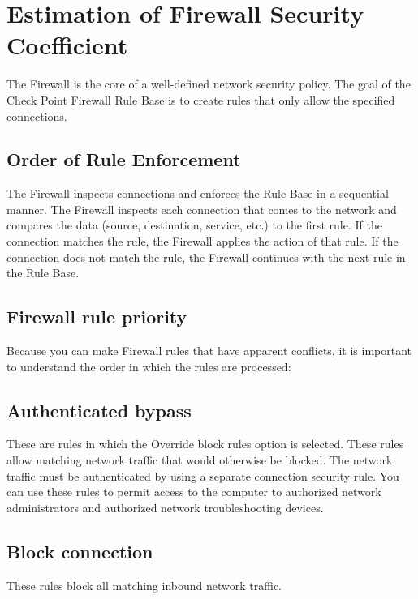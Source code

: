 
\section{Estimation of Firewall Security Coefficient}

The Firewall is the core of a well-defined network security policy. The goal of the Check Point Firewall Rule Base is to create rules that only allow the specified connections.
\subsection{Order of Rule Enforcement}
The Firewall inspects connections and enforces the Rule Base in a sequential manner. The Firewall inspects each connection that comes to the network and compares the data (source, destination, service, etc.) to the first rule. If the connection matches the rule, the Firewall applies the action of that rule. If the connection does not match the rule, the Firewall continues with the next rule in the Rule Base.

 \subsection{Firewall rule priority}
Because you can make Firewall rules that have apparent conflicts, it is important to understand the order in which the rules are processed:
\subsection{Authenticated bypass}
These are rules in which the Override block rules option is selected. These rules allow matching network traffic that would otherwise be blocked. The network traffic must be authenticated by using a separate connection security rule. You can use these rules to permit access to the computer to authorized network administrators and authorized network troubleshooting devices.
\subsection{Block connection}
       These rules block all matching inbound network traffic.
